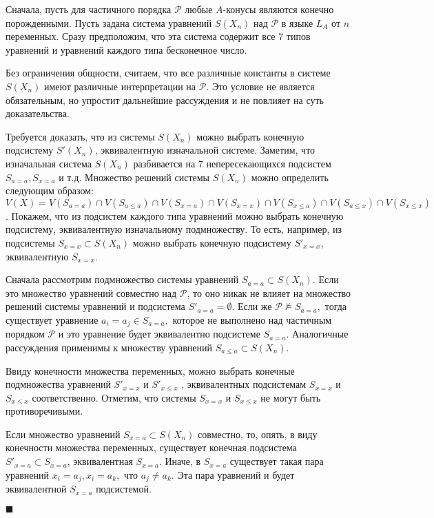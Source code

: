 \documentclass[12pt]{article}
\theoremstyle{break}
\newenvironment{Proof} %
	{\par\noindent{\bf Доказательство.}} %
	{\hfill$\scriptstyle\blacksquare$} %
\def\P{\mathcal{P}}
\begin{document}
		\begin{Proof}
			Сначала, пусть для частичного порядка $\P$ любые $A$-конусы являются конечно порожденными. Пусть задана система уравнений $S(X_n)$ над $\P$ в языке $L_A$ от $n$ переменных. Сразу предположим, что эта система содержит все 7 типов уравнений и уравнений каждого типа бесконечное число.

			Без ограничения общности, считаем, что все различные константы в системе $S(X_n)$ имеют различные интерпретации на $\P$. Это условие не является обязательным, но упростит дальнейшие рассуждения и не повлияет на суть доказательства.

			Требуется доказать, что из системы $S(X_n)$ можно выбрать конечную подсистему $S'(X_n)$, эквивалентную  изначальной системе. Заметим, что изначальная система $S(X_n)$ разбивается на 7 непересекающихся подсистем $S_{a=a}, S_{x=a}$ и т.д. Множество решений системы $S(X_n)$ можно определить следующим образом: $V(X) = V(S_{a=a})\cap V(S_{a\leqslant a})\cap V(S_{x=a})\cap V(S_{x=x})\cap V(S_{x\leqslant a})\cap V(S_{a\leqslant x})\cap V(S_{x\leqslant x})$. Покажем, что из подсистем каждого типа уравнений можно выбрать конечную подсистему, эквивалентную изначальному подмножеству. То есть, например, из подсистемы $S_{x=x}\subset S(X_n)$ можно выбрать конечную подсистему $S'_{x=x}$, эквивалентную $S_{x=x}$.

			Сначала рассмотрим подмножество системы уравнений $S_{a=a}\subset S(X_n)$. Если это множество уравнений совместно над $\P$, то оно никак не влияет на множество решений системы уравнений и подсистема $S'_{a=a} = \emptyset$. Если же $\P\nvDash S_{a=a},$ тогда существует уравнение $a_i=a_j\in S_{a=a},$ которое не выполнено над частичным порядком $\P$ и это уравнение будет эквивалентно подсистеме $S_{a=a}$. Аналогичные рассуждения применимы к множеству уравнений $S_{a\leqslant a}\subset S(X_n).$

			Ввиду конечности множества переменных, можно выбрать конечные подмножества уравнений $S'_{x=x}$ и $S'_{x\leqslant x}$ , эквивалентных подсистемам $S_{x=x}$ и $S_{x\leqslant x}$ соответственно. Отметим, что системы $S_{x=x}$ и $S_{x\leqslant x}$ не могут быть противоречивыми.

			Если множество уравнений $S_{x=a}\subset S(X_n)$ совместно, то, опять, в виду конечности множества переменных, существует конечная подсистема $S'_{x=a}\subset S_{x=a}$, эквивалентная $S_{x=a}.$ Иначе, в $S_{x=a}$  существует такая пара уравнений $x_i=a_j, x_i=a_k,$ что $a_j\neq a_k$. Эта пара уравнений и будет эквивалентной $S_{x=a}$ подсистемой.


\end{Proof}
\end{document}

